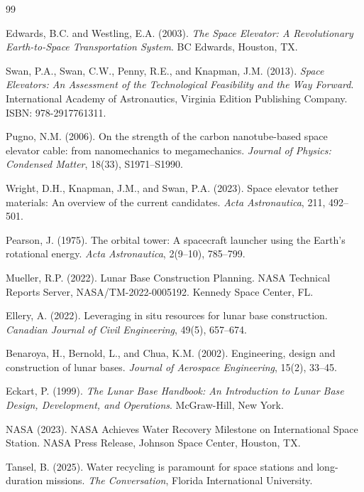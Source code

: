 \documentclass[12pt]{article}
\begin{document}
\begin{thebibliography}{99}
	
	Edwards, B.C. and Westling, E.A. (2003). \textit{The Space Elevator: A Revolutionary Earth-to-Space Transportation System}. BC Edwards, Houston, TX.
	
	Swan, P.A., Swan, C.W., Penny, R.E., and Knapman, J.M. (2013). \textit{Space Elevators: An Assessment of the Technological Feasibility and the Way Forward}. International Academy of Astronautics, Virginia Edition Publishing Company. ISBN: 978-2917761311.
	
	Pugno, N.M. (2006). On the strength of the carbon nanotube-based space elevator cable: from nanomechanics to megamechanics. \textit{Journal of Physics: Condensed Matter}, 18(33), S1971--S1990.
	
	Wright, D.H., Knapman, J.M., and Swan, P.A. (2023). Space elevator tether materials: An overview of the current candidates. \textit{Acta Astronautica}, 211, 492--501.
	
	Pearson, J. (1975). The orbital tower: A spacecraft launcher using the Earth's rotational energy. \textit{Acta Astronautica}, 2(9--10), 785--799.
	
	Mueller, R.P. (2022). Lunar Base Construction Planning. NASA Technical Reports Server, NASA/TM-2022-0005192. Kennedy Space Center, FL.
	
	Ellery, A. (2022). Leveraging in situ resources for lunar base construction. \textit{Canadian Journal of Civil Engineering}, 49(5), 657--674.
	
	Benaroya, H., Bernold, L., and Chua, K.M. (2002). Engineering, design and construction of lunar bases. \textit{Journal of Aerospace Engineering}, 15(2), 33--45.
	
	Eckart, P. (1999). \textit{The Lunar Base Handbook: An Introduction to Lunar Base Design, Development, and Operations}. McGraw-Hill, New York.
	
	NASA (2023). NASA Achieves Water Recovery Milestone on International Space Station. NASA Press Release, Johnson Space Center, Houston, TX.
	
	Tansel, B. (2025). Water recycling is paramount for space stations and long-duration missions. \textit{The Conversation}, Florida International University.
	

\end{thebibliography}
\end{document}
